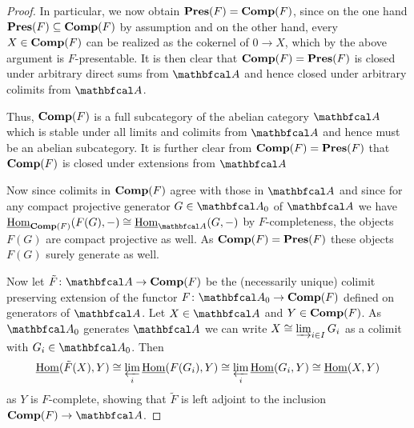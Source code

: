 \begin{proof}
	In particular, we now obtain ${{\mathbf{Pres}}(F)}={{\mathbf{Comp}}(F)}$, since on the one hand ${{\mathbf{Pres}}(F)}\subseteq{{\mathbf{Comp}}(F)}$ by assumption and on the other hand, every $X\in {{\mathbf{Comp}}(F)}$ can be realized as the cokernel of $0\to X$, which by the above argument is $F$-presentable. It is then clear that ${{\mathbf{Comp}}(F)}={{\mathbf{Pres}}(F)}$ is closed under arbitrary direct sums from $\category A$ and hence closed under arbitrary colimits from $\category A$. 
	
	Thus, ${{\mathbf{Comp}}(F)}$ is a full subcategory of the abelian category $\category{A}$ which is stable under all limits and colimits from $\category{A}$ and hence must be an abelian subcategory. It is further clear from ${{\mathbf{Comp}}(F)}={{\mathbf{Pres}}(F)}$ that ${{\mathbf{Comp}}(F)}$ is closed under extensions from $\category{A}$
	
	Now since colimits in ${{\mathbf{Comp}}(F)}$ agree with those in $\category{A}$ and since for any compact projective generator $G\in\category{A}_0$ of $\category{A}$ we have $\eHom_{\completeMod{F}}(F(G), -) \cong \eHom_{\category{A}}(G, -)$ by $F$-completeness, the objects $F(G)$ are compact projective as well. As ${{\mathbf{Comp}}(F)} = {{\mathbf{Pres}}(F)}$ these objects $F(G)$ surely generate as well.
	
	Now let $\tilde F\colon \category{A}\to\completeMod{F}$ be the (necessarily unique) colimit preserving extension of the functor $F\colon \category{A}_0\to \completeMod{F}$ defined on generators of $\category{A}$. Let $X\in \category A$ and $Y\in {{\mathbf{Comp}}(F)}$. As $\category{A}_0$ generates $\category A$ we can write $X\cong \varinjlim_{i\in I} G_i$ as a colimit with $G_i \in \category{A}_0$. Then
		$${\underline{\operatorname{Hom}}}(\tilde F(X), Y) \cong \varprojlim_i {\underline{\operatorname{Hom}}}(F(G_i), Y) \cong \varprojlim_i {\underline{\operatorname{Hom}}}(G_i, Y) \cong {\underline{\operatorname{Hom}}}(X, Y)$$
	as $Y$ is $F$-complete,	showing that $\tilde F$ is left adjoint to the inclusion $\completeMod{F}\to \category{A}$.
	

\end{proof}
